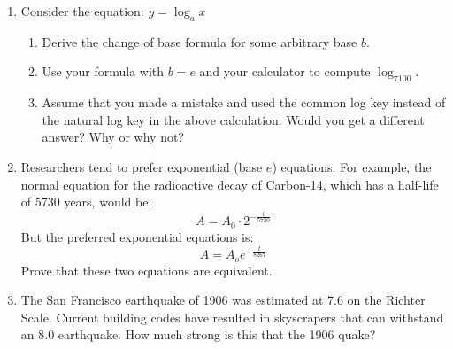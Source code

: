 \documentclass[letterpaper,12pt,fleqn]{article}
\begin{document}
\begin{enumerate}
\item Consider the equation: $y=\log_a{x}$
\begin{enumerate}
\item Derive the change of base formula for some arbitrary base $b$.
\item Use your formula with $b=e$ and your calculator to compute $\log_7100$.
\item Assume that you made a mistake and used the common log key instead of the
natural log key in the above calculation. Would you get a different answer?
Why or why not?
\end{enumerate} 
\newpage
\item Researchers tend to prefer exponential (base $e$) equations. For example,
the normal equation for the radioactive decay of Carbon-14, which has a
half-life of 5730 years, would be:
\[A=A_0\cdot2^{-\frac{t}{5730}}\]
But the preferred exponential equations is:
\[A=A_oe^{-\frac{t}{8267}}\]
Prove that these two equations are equivalent.

\item The San Francisco earthquake of 1906 was estimated at 7.6 on the Richter
Scale. Current building codes have resulted in skyscrapers that can withstand
an 8.0 earthquake. How much strong is this that the 1906 quake?
\end{enumerate}
\end{document}

